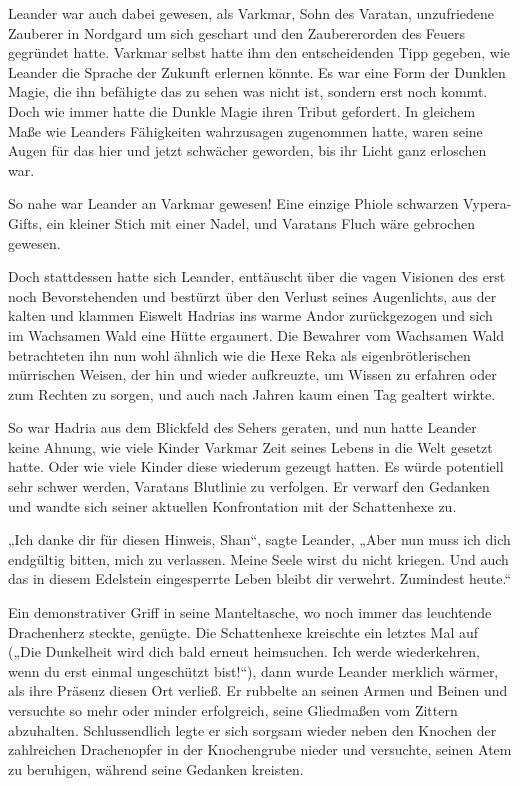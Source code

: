 Leander war auch dabei gewesen, als Varkmar, Sohn des Varatan, unzufriedene Zauberer in Nordgard um sich geschart und den Zaubererorden des Feuers gegründet hatte. Varkmar selbst hatte ihm den entscheidenden Tipp gegeben, wie Leander die Sprache der Zukunft erlernen könnte. Es war eine Form der Dunklen Magie, die ihn befähigte das zu sehen was nicht ist, sondern erst noch kommt. Doch wie immer hatte die Dunkle Magie ihren Tribut gefordert. In gleichem Maße wie Leanders Fähigkeiten wahrzusagen zugenommen hatte, waren seine Augen für das hier und jetzt schwächer geworden, bis ihr Licht ganz erloschen war.

So nahe war Leander an Varkmar gewesen! Eine einzige Phiole schwarzen Vypera-Gifts, ein kleiner Stich mit einer Nadel, und Varatans Fluch wäre gebrochen gewesen.

Doch stattdessen hatte sich Leander, enttäuscht über die vagen Visionen des erst noch Bevorstehenden und bestürzt über den Verlust seines Augenlichts, aus der kalten und klammen Eiswelt Hadrias ins warme Andor zurückgezogen und sich im Wachsamen Wald eine Hütte ergaunert. Die Bewahrer vom Wachsamen Wald betrachteten ihn nun wohl ähnlich wie die Hexe Reka als eigenbrötlerischen mürrischen Weisen, der hin und wieder aufkreuzte, um Wissen zu erfahren oder zum Rechten zu sorgen, und auch nach Jahren kaum einen Tag gealtert wirkte.

So war Hadria aus dem Blickfeld des Sehers geraten, und nun hatte Leander keine Ahnung, wie viele Kinder Varkmar Zeit seines Lebens in die Welt gesetzt hatte. Oder wie viele Kinder diese wiederum gezeugt hatten. Es würde potentiell sehr schwer werden, Varatans Blutlinie zu verfolgen. Er verwarf den Gedanken und wandte sich seiner aktuellen Konfrontation mit der Schattenhexe zu.

„Ich danke dir für diesen Hinweis, Shan“, sagte Leander, „Aber nun muss ich dich endgültig bitten, mich zu verlassen. Meine Seele wirst du nicht kriegen. Und auch das in diesem Edelstein eingesperrte Leben bleibt dir verwehrt. Zumindest heute.“

Ein demonstrativer Griff in seine Manteltasche, wo noch immer das leuchtende Drachenherz steckte, genügte. Die Schattenhexe kreischte ein letztes Mal auf („Die Dunkelheit wird dich bald erneut heimsuchen. Ich werde wiederkehren, wenn du erst einmal ungeschützt bist!“), dann wurde Leander merklich wärmer, als ihre Präsenz diesen Ort verließ. Er rubbelte an seinen Armen und Beinen und versuchte so mehr oder minder erfolgreich, seine Gliedmaßen vom Zittern abzuhalten. Schlussendlich legte er sich sorgsam wieder neben den Knochen der zahlreichen Drachenopfer in der Knochengrube nieder und versuchte, seinen Atem zu beruhigen, während seine Gedanken kreisten.\bigskip







